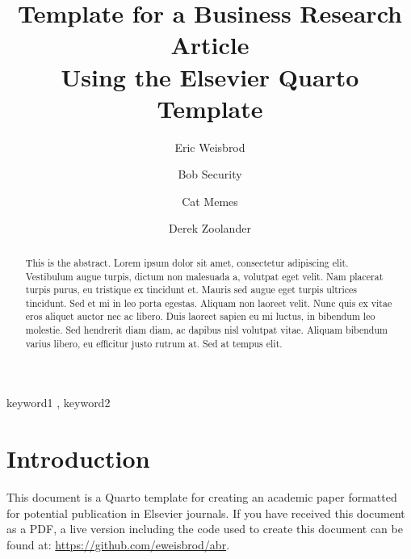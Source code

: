 \documentclass[
  authoryear,
  preprint]{elsarticle}
\begin{document}
\begin{frontmatter}
\title{Template for a Business Research Article \\\large{Using the
Elsevier Quarto Template} }
\author[1]{Eric Weisbrod%
%
}
\author[2]{Bob Security%
%
}
\author[2]{Cat Memes%
%
}
\author[1]{Derek Zoolander%
%
}






        
\begin{abstract}
This is the abstract. Lorem ipsum dolor sit amet, consectetur adipiscing
elit. Vestibulum augue turpis, dictum non malesuada a, volutpat eget
velit. Nam placerat turpis purus, eu tristique ex tincidunt et. Mauris
sed augue eget turpis ultrices tincidunt. Sed et mi in leo porta
egestas. Aliquam non laoreet velit. Nunc quis ex vitae eros aliquet
auctor nec ac libero. Duis laoreet sapien eu mi luctus, in bibendum leo
molestie. Sed hendrerit diam diam, ac dapibus nisl volutpat vitae.
Aliquam bibendum varius libero, eu efficitur justo rutrum at. Sed at
tempus elit.
\end{abstract}





\begin{keyword}
    keyword1 \sep 
    keyword2
\end{keyword}
\end{frontmatter}
    


\newpage

\section{Introduction}\label{introduction}

This document is a Quarto template for creating an academic paper
formatted for potential publication in Elsevier journals. If you have
received this document as a PDF, a live version including the code used
to create this document can be found at:
\url{https://github.com/eweisbrod/abr}.
\end{document}
